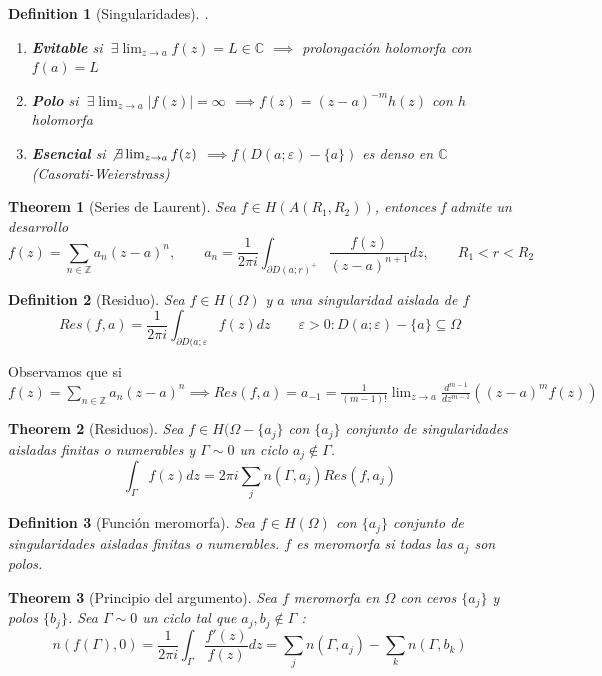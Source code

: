 \documentclass{myclass}
\newtheorem*{definition}{Definition}
\newtheorem*{theorem}{Theorem}
\begin{document}
\begin{definition}[Singularidades] .
\begin{enumerate}[topsep=-6pt, itemsep=0pt]
  \item \textbf{Evitable} si $\ \exists \lim_{z\to a}f(z)=L\in \mathbb{C}$ $\implies$ prolongación holomorfa con $f(a) = L$ 
  \item \textbf{Polo} si $\ \exists \lim_{z\to a}|f(z)|=\infty$ $\implies f(z) = (z-a)^{-m}h(z)$ con $h$ holomorfa
  \item \textbf{Esencial} si $\not \exists \lim_{z\to a}f(z)$ $\implies f(D(a;\varepsilon )-\{a\})$ es denso en $\mathbb{C}$ (Casorati-Weierstrass)
\end{enumerate}
\end{definition}

\begin{theorem}[Series de Laurent]
Sea $f\in H(A(R_1, R_2))$, entonces f admite un desarrollo
\[
f(z) = \sum_{n\in \mathbb{Z}} a_n(z-a)^n, \qquad a_n = \frac{1}{2\pi i} \int_{\partial D(a;r)^+} \frac{f(z)}{(z-a)^{n+1}}dz, \qquad R_1<r<R_2
\] 
\end{theorem}

\begin{definition}[Residuo]
Sea $f\in H(\Omega)$ y $a$ una singularidad aislada de $f$ 
\[
Res(f, a) = \frac{1}{2\pi i}\int_{\partial D(a; \varepsilon } f(z)dz \qquad \varepsilon >0 : D(a;\varepsilon )-\{a\} \subseteq \Omega
\] 
\end{definition}
Observamos que si $\displaystyle  f(z) = \sum_{n\in \mathbb{Z}} a_n(z-a)^n  \implies Res(f, a) = a_{-1} =  \frac{1}{(m-1)!} \lim_{z\to a} \frac{d^{m-1}}{dz^{m-1}}\left((z-a)^mf(z)\right)$ 

\begin{theorem}[Residuos]
Sea $f\in H(\Omega-\{a_j\}$ con $\{a_j\}$ conjunto de singularidades aisladas finitas o numerables y $\Gamma \sim 0$ un ciclo  $a_j\not\in \Gamma$.
\[
\int_\Gamma f(z)dz = 2\pi i \sum_j n(\Gamma, a_j)Res(f, a_j)
\] 
\end{theorem}

\begin{definition}[Función meromorfa]
Sea $f\in H(\Omega)$ con $\{a_j\}$ conjunto de singularidades aisladas finitas o numerables.  $f$ es meromorfa si todas las $a_j$ son polos.
\end{definition}

\begin{theorem}[Principio del argumento]
Sea $f$ meromorfa en $\Omega$ con ceros $\{a_j\}$ y polos  $\{b_j\}$. Sea $\Gamma \sim 0$ un ciclo tal que $a_j, b_j \not \in \Gamma $ :
\[
n(f(\Gamma ), 0) = \frac{1}{2\pi i} \int_\Gamma \frac{f'(z)}{f(z)}dz = \sum_j n(\Gamma , a_j) - \sum_k n(\Gamma , b_k)
\]
\end{theorem}
\end{document}

